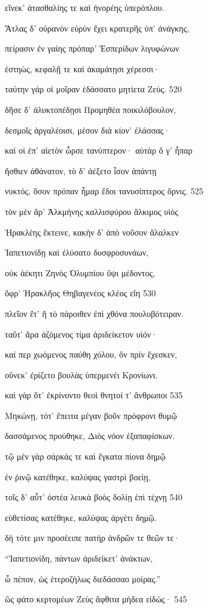 εἵνεκ' ἀτασθαλίης τε καὶ ἠνορέης ὑπερόπλου.

Ἄτλας δ' οὐρανὸν εὐρὺν ἔχει κρατερῆς ὑπ' ἀνάγκης, 

πείρασιν ἐν γαίης πρόπαρ' Ἑσπερίδων λιγυφώνων 

ἑστηώς, κεφαλῇ τε καὶ ἀκαμάτῃσι χέρεσσι· 

ταύτην γάρ οἱ μοῖραν ἐδάσσατο μητίετα Ζεύς. \num{520}

δῆσε δ' ἀλυκτοπέδῃσι Προμηθέα ποικιλόβουλον,

δεσμοῖς ἀργαλέοισι, μέσον διὰ κίον' ἐλάσσας· 

καί οἱ ἐπ' αἰετὸν ὦρσε τανύπτερον· αὐτὰρ ὅ γ' ἧπαρ 

ἤσθιεν ἀθάνατον, τὸ δ' ἀέξετο ἶσον ἁπάντῃ 

νυκτός, ὅσον πρόπαν ἦμαρ ἔδοι τανυσίπτερος ὄρνις. \num{525} 

τὸν μὲν ἄρ' Ἀλκμήνης καλλισφύρου ἄλκιμος υἱὸς

Ἡρακλέης ἔκτεινε, κακὴν δ' ἀπὸ νοῦσον ἄλαλκεν

Ἰαπετιονίδῃ καὶ ἐλύσατο δυσφροσυνάων, 

οὐκ ἀέκητι Ζηνὸς Ὀλυμπίου ὕψι μέδοντος,

ὄφρ' Ἡρακλῆος Θηβαγενέος κλέος εἴη \num{530}

πλεῖον ἔτ' ἢ τὸ πάροιθεν ἐπὶ χθόνα πουλυβότειραν.

ταῦτ' ἄρα ἁζόμενος τίμα ἀριδείκετον υἱόν·

καί περ χωόμενος παύθη χόλου, ὃν πρὶν ἔχεσκεν,

οὕνεκ' ἐρίζετο βουλὰς ὑπερμενέι Κρονίωνι.

καὶ γὰρ ὅτ' ἐκρίνοντο θεοὶ θνητοί τ' ἄνθρωποι \num{535}

Μηκώνῃ, τότ' ἔπειτα μέγαν βοῦν πρόφρονι θυμῷ

δασσάμενος προύθηκε, Διὸς νόον ἐξαπαφίσκων. 

τῷ μὲν γὰρ σάρκάς τε καὶ ἔγκατα πίονα δημῷ 

ἐν ῥινῷ κατέθηκε, καλύψας γαστρὶ βοείῃ,

τοῖς δ' αὖτ' ὀστέα λευκὰ βοὸς δολίῃ ἐπὶ τέχνῃ \num{540} 

εὐθετίσας κατέθηκε, καλύψας ἀργέτι δημῷ. 

δὴ τότε μιν προσέειπε πατὴρ ἀνδρῶν τε θεῶν τε· 

``Ἰαπετιονίδη, πάντων ἀριδείκετ' ἀνάκτων, 

ὦ πέπον, ὡς ἑτεροζήλως διεδάσσαο μοίρας.'' 

ὣς φάτο κερτομέων Ζεὺς ἄφθιτα μήδεα εἰδώς· \num{545} 

